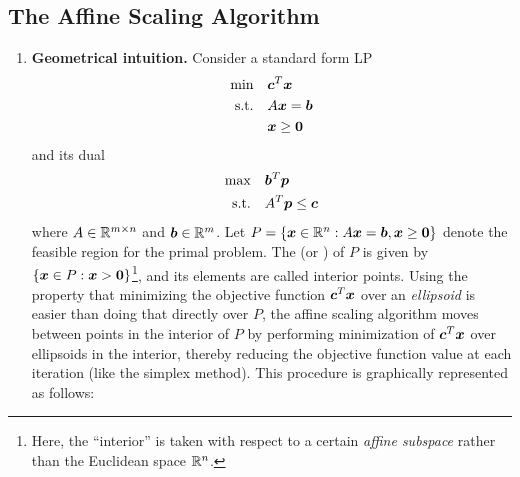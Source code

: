 \subsection{The Affine Scaling Algorithm}
\begin{enumerate}
\item \textbf{Geometrical intuition.} Consider a standard form LP
\begin{align*}
\text{min}\quad&\bm{c}^{T}\bm{x} \\
\text{s.t.}\quad&A\bm{x}=\bm{b} \\
&\bm{x}\ge \bm{0}
\end{align*}
and its dual
\begin{align*}
\text{max}\quad&\bm{b}^{T}\bm{p} \\
\text{s.t.}\quad&A^{T}\bm{p}\le\bm{c} \\
\end{align*}
where \(A\in\mathbb{R}^{m\times n}\) and \(\bm{b}\in\mathbb{R}^{m}\). Let
\(P=\{\bm{x}\in\mathbb{R}^n:A\bm{x}=\bm{b},\bm{x}\ge\bm{0}\}\) denote the
feasible region for the primal problem. The  (or ) of \(P\) is given by \(\{\bm{x}\in
P:\bm{x}>\bm{0}\}\)\footnote{Here, the ``interior'' is taken with respect
to a certain \emph{affine subspace} rather than the Euclidean space
\(\mathbb{R}^{n}\).}, and its elements are called interior points. Using the property
that minimizing the objective function \(\bm{c}^{T}\bm{x}\) over an
\emph{ellipsoid} is easier than doing that directly over \(P\), the affine scaling
algorithm moves between points in the interior of \(P\) by performing
minimization of \(\bm{c}^{T}\bm{x}\) over ellipsoids in the interior,
thereby reducing the objective function value at each iteration (like the
simplex method). This procedure is graphically represented as follows:
\begin{center}
\end{center}
\end{enumerate}
